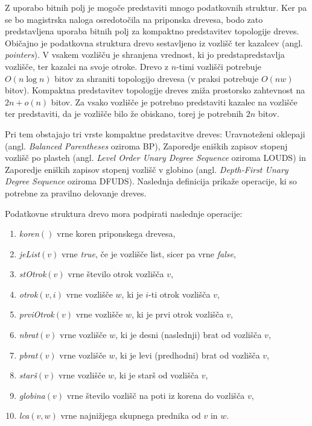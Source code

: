 Z uporabo bitnih polj je mogoče predstaviti mnogo podatkovnih struktur. Ker pa se bo magistrska naloga osredotočila na priponska drevesa, bodo zato predstavljena uporaba bitnih polj za kompaktno predstavitev topologije dreves. Običajno je podatkovna struktura drevo sestavljeno iz vozlišč ter kazalcev (angl. \textit{pointers}). V vsakem vozlišču je shranjena vrednost, ki jo predstapredstavlja vozlišče, ter kazalci na svoje otroke. Drevo z $n$-timi vozlišči potrebuje $O(n\log{n})$ bitov za shraniti topologijo drevesa (v praksi potrebuje $O(nw)$ bitov). Kompaktna predstavitev topologije dreves zniža prostorsko zahtevnost na $2n+o(n)$ bitov. Za vsako vozlišče je potrebno predstaviti kazalec na vozlišče ter predstaviti, da je vozlišče bilo že obiskano, torej je potrebnih $2n$ bitov.

Pri tem obstajajo tri vrste kompaktne predstavitve dreves: Uravnoteženi oklepaji (angl. \textit{Balanced Parentheses} oziroma BP), Zaporedje eniških zapisov stopenj vozlišč po plasteh (angl. \textit{Level Order Unary Degree Sequence} oziroma LOUDS) in Zaporedje eniških zapisov stopenj vozlišč v globino (angl. \textit{Depth-First Unary Degree Sequence} oziroma DFUDS).
Naslednja definicija prikaže operacije, ki so potrebne za pravilno delovanje dreves.

\newpage

\begin{defi}\label{def:drevo}
    Podatkovne struktura drevo mora podpirati naslednje operacije:
    \begin{enumerate}
        \item \textit{koren}$()$ vrne koren priponskega drevesa,
        \item \textit{jeList}$(v)$ vrne \textit{true}, če je vozlišče list, sicer pa vrne \textit{false},
        \item \textit{stOtrok}$(v)$ vrne število otrok vozlišča $v$,
        \item \textit{otrok}$(v,i)$ vrne vozlišče $w$, ki je $i$-ti otrok vozlišča $v$,
        \item \textit{prviOtrok}$(v)$ vrne vozlišče $w$, ki je prvi otrok vozlišča $v$,
        \item \textit{nbrat}$(v)$ vrne vozlišče $w$, ki je desni (naslednji) brat od vozlišča $v$,
        \item \textit{pbrat}$(v)$ vrne vozlišče $w$, ki je levi (predhodni) brat od vozlišča $v$,
        \item \textit{starš}$(v)$ vrne vozlišče $w$, ki je starš od vozlišča $v$,
        \item \textit{globina}$(v)$ vrne število vozlišč na poti iz korena do vozlišča $v$,
        \item \textit{lca}$(v,w)$ vrne najnižjega skupnega prednika od $v$ in $w$.
    \end{enumerate}
\end{defi}

